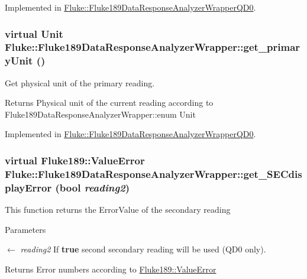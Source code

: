 Implemented in \hyperlink{classFluke_1_1Fluke189DataResponseAnalyzerWrapperQD0_acffb9af55e2d690060ef210977c3c933}{Fluke::Fluke189DataResponseAnalyzerWrapperQD0}.\hypertarget{classFluke_1_1Fluke189DataResponseAnalyzerWrapper_a81fd0f497095dba37f2a614bd35426db}{
\subsubsection[{get\_\-primaryUnit}]{\setlength{\rightskip}{0pt plus 5cm}virtual {\bf Unit} Fluke::Fluke189DataResponseAnalyzerWrapper::get\_\-primaryUnit ()}}
\label{classFluke_1_1Fluke189DataResponseAnalyzerWrapper_a81fd0f497095dba37f2a614bd35426db}
Get physical unit of the primary reading. \begin{DoxyReturn}{Returns}
Physical unit of the current reading according to Fluke189DataResponseAnalyzerWrapper::enum Unit 
\end{DoxyReturn}


Implemented in \hyperlink{classFluke_1_1Fluke189DataResponseAnalyzerWrapperQD0_af71dd62d9f81866ad3cb96c580754329}{Fluke::Fluke189DataResponseAnalyzerWrapperQD0}.\hypertarget{classFluke_1_1Fluke189DataResponseAnalyzerWrapper_aaf53f3e129ae21be4abe85bf4998fed5}{
\subsubsection[{get\_\-SECdisplayError}]{\setlength{\rightskip}{0pt plus 5cm}virtual {\bf Fluke189::ValueError} Fluke::Fluke189DataResponseAnalyzerWrapper::get\_\-SECdisplayError (bool {\em reading2})}}
\label{classFluke_1_1Fluke189DataResponseAnalyzerWrapper_aaf53f3e129ae21be4abe85bf4998fed5}
This function returns the ErrorValue of the secondary reading 
\begin{DoxyParams}{Parameters}
\item[\mbox{$\leftarrow$} {\em reading2}]If {\bfseries true} second secondary reading will be used (QD0 only). \end{DoxyParams}
\begin{DoxyReturn}{Returns}
Error numbers according to \hyperlink{classFluke_1_1Fluke189_a5dc0eaffde0a29a64cbcbd50d4178491}{Fluke189::ValueError} 
\end{DoxyReturn}


